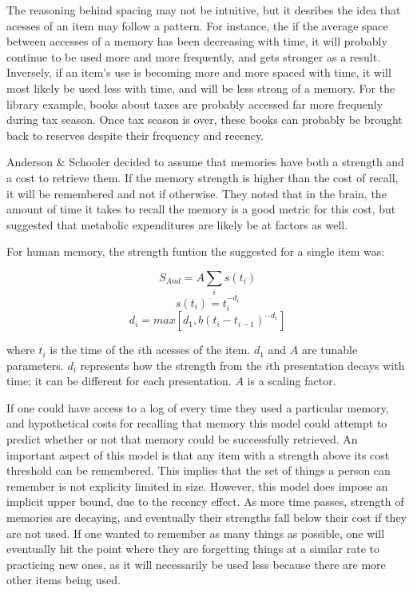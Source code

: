 \documentclass[10pt,letterpaper]{article}
\begin{document}
The reasoning behind spacing may not be intuitive, but it desribes the idea that
acesses of an item may follow a pattern. For instance, the if the average space between
accesses of a memory has been decreasing with time, it will probably continue to be used more and more frequently,
and gets stronger as a result. Inversely, if an item's use is becoming more and more spaced with time,
it will most likely be used less with time, and will be less strong of a memory.
For the library example, books about taxes are probably
accessed far more frequenly during tax season. Once tax season is over, these books can
probably be brought back to reserves despite their frequency and recency. 

Anderson \& Schooler decided to assume that memories have both a strength and a cost to retrieve them. If the memory strength
is higher than the cost of recall, it will be remembered and not if otherwise. They noted that in the brain, the amount of time
it takes to recall the memory is a good metric for this cost, but suggested that metabolic expenditures are 
likely be at factors as well.

For human memory, the strength funtion the suggested for a single item was:

$$
S_{And} = A \sum_i s(t_i)
$$
$$
s(t_i) = t_i^{-d_i}
$$
$$
d_i = max[d_1, b(t_i- t_{i-1})^{-d_1}]
$$

where $t_i$ is the time of the $i$th acesses of the item. $d_1$ and $A$ are tunable parameters. $d_i$ represents how the
strength from the $i$th presentation decays with time; it can be different for each presentation. $A$ is a scaling factor.

If one could have access to a log of every time they used a particular memory, and hypothetical costs for recalling that memory
this model could attempt to predict whether or not that memory could be successfully retrieved. An important aspect of this model
is that any item with a strength above its cost threshold can be remembered. This implies that the
set of things a person can remember is not explicity limited in size. However, this model does impose an implicit upper bound,
due to the recency effect. As more time passes, strength of memories are decaying, and eventually their strengths fall below their cost
if they are not used. If one wanted to remember as many things as possible, one will eventually hit the point where they are forgetting
things at a similar rate to practicing new ones, as it will necessarily be used less because there are more other items being used.
\end{document}
